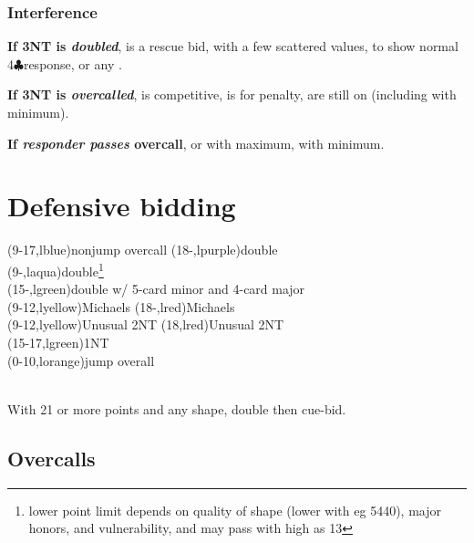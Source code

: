 \documentclass[oneside]{memoir}
\def\C{$\clubsuit$}
\begin{document}
\subsection{Interference}
\textbf{If 3NT is \emph{doubled}}, \textbid[lorange]{4\C} is a rescue bid,
 with a few scattered values, 
to show normal 4\C response, or any .

\noindent\textbf{If 3NT is \emph{overcalled}}, 
is competitive,  is for penalty,
 are still on (including
 with minimum).

\noindent\textbf{If \emph{responder passes} overcall}, 
or  with maximum,  with minimum.

\chapter{Defensive bidding}
\begin{ptable}
\bid(9-17,lblue){nonjump overcall}
\bid(18-,lpurple){double}\\
\bid(9-,laqua){double\footnote{lower point limit depends on quality of 
shape (lower with eg 5440), major honors, and vulnerability, and may pass 
with high as 13}}\\
\bid(15-,lgreen){double w/ 5-card minor and 4-card major}\\
\row{}
\bid(9-12,lyellow){Michaels}
\bid(18-,lred){Michaels}\\
\row{}
\bid(9-12,lyellow){Unusual 2NT}
\bid(18,lred){Unusual 2NT}\\
\bid(15-17,lgreen){1NT}\\
\bid(0-10,lorange){jump overall}\\
\end{ptable}\\
With 21 or more points and any shape, double then cue-bid.

\section{Overcalls}
\end{document}
